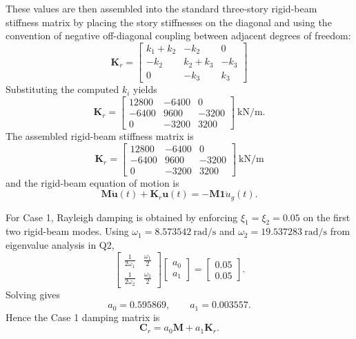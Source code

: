 \documentclass[11pt,a4paper]{article}
\begin{document}
These values are then assembled into the standard three-story rigid-beam stiffness matrix by placing the story stiffnesses on the diagonal and using the convention of negative off-diagonal coupling between adjacent degrees of freedom:
\begin{equation}
\boxed{\bm{K}_r=\begin{bmatrix}
k_1+k_2 & -k_2 & 0\\
-k_2 & k_2+k_3 & -k_3\\
0 & -k_3 & k_3
\end{bmatrix}}
\end{equation}
Substituting the computed $k_i$ yields
\begin{equation}
\boxed{\bm{K}_r=\begin{bmatrix}
12800 & -6400 & 0\\
-6400 & 9600 & -3200\\
0 & -3200 & 3200
\end{bmatrix}\ \mathrm{kN/m}.}
\end{equation}
The assembled rigid-beam stiffness matrix is
\begin{equation}
\boxed{
\bm{K}_r=
\begin{bmatrix}
12800 & -6400 & 0\\
-6400 & 9600 & -3200\\
0 & -3200 & 3200
\end{bmatrix}
\ \mathrm{kN/m}
}
\label{eq:Kr}
\end{equation}
and the rigid-beam equation of motion is
\begin{equation}
\bm{M}\ddot{\bm{u}}(t)+\bm{K}_r\bm{u}(t)
=-\bm{M}\bm{1}\ddot{u}_g(t).
\end{equation}

For Case 1, Rayleigh damping is obtained by enforcing $\xi_1=\xi_2=0.05$ on the first two rigid-beam modes. Using $\omega_1=8.573542\ \mathrm{rad/s}$ and $\omega_2=19.537283\ \mathrm{rad/s}$ from eigenvalue analysis in Q2,
\begin{equation}
\begin{bmatrix}
\frac{1}{2\omega_1} & \frac{\omega_1}{2}\\
\frac{1}{2\omega_2} & \frac{\omega_2}{2}
\end{bmatrix}
\begin{bmatrix}
a_0\\
a_1
\end{bmatrix}
=
\begin{bmatrix}
0.05\\
0.05
\end{bmatrix}.
\end{equation}
Solving gives
\begin{equation}
\boxed{a_0=0.595869},
\qquad
\boxed{a_1=0.003557}.
\end{equation}
Hence the Case 1 damping matrix is
\begin{equation}
\bm{C}_r=a_0\bm{M}+a_1\bm{K}_r.
\end{equation}
\end{document}
